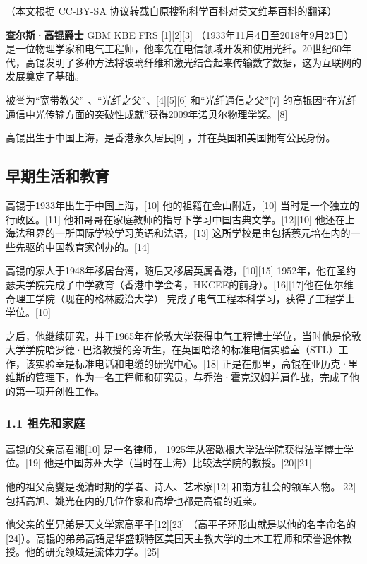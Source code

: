 
（本文根据 CC-BY-SA 协议转载自原搜狗科学百科对英文维基百科的翻译）

\textbf{查尔斯·高锟爵士} GBM KBE FRS [1][2][3] （1933年11月4日至2018年9月23日）是一位物理学家和电气工程师，他率先在电信领域开发和使用光纤。20世纪60年代，高锟发明了多种方法将玻璃纤维和激光结合起来传输数字数据，这为互联网的发展奠定了基础。

被誉为“宽带教父” 、“光纤之父”、[4][5][6] 和“光纤通信之父”[7] 的高锟因“在光纤通信中光传输方面的突破性成就”获得2009年诺贝尔物理学奖。[8]

高锟出生于中国上海，是香港永久居民[9] ，并在英国和美国拥有公民身份。

\subsection{早期生活和教育}
高锟于1933年出生于中国上海，[10] 他的祖籍在金山附近，[10] 当时是一个独立的行政区。[11] 他和哥哥在家庭教师的指导下学习中国古典文学。[12][10] 他还在上海法租界的一所国际学校学习英语和法语，[13] 这所学校是由包括蔡元培在内的一些先驱的中国教育家创办的。[14]

高锟的家人于1948年移居台湾，随后又移居英属香港，[10][15] 1952年，他在圣约瑟夫学院完成了中学教育（香港中学会考，HKCEE的前身）。[16][17]他在伍尔维奇理工学院（现在的格林威治大学） 完成了电气工程本科学习，获得了工程学士学位。[10]

之后，他继续研究，并于1965年在伦敦大学获得电气工程博士学位，当时他是伦敦大学学院哈罗德·巴洛教授的旁听生，在英国哈洛的标准电信实验室（STL）工作，该实验室是标准电话和电缆的研究中心。[18] 正是在那里，高锟在亚历克·里维斯的管理下，作为一名工程师和研究员，与乔治·霍克汉姆并肩作战，完成了他的第一项开创性工作。

\subsubsection{1.1 祖先和家庭}
高锟的父亲高君湘[10] 是一名律师， 1925年从密歇根大学法学院获得法学博士学位。[19] 他是中国苏州大学（当时在上海）比较法学院的教授。[20][21]

他的祖父高燮是晚清时期的学者、诗人、艺术家[12] 和南方社会的领军人物。[22] 包括高旭、姚光在内的几位作家和高增也都是高锟的近亲。

他父亲的堂兄弟是天文学家高平子[12][23] （高平子环形山就是以他的名字命名的[24]）。高锟的弟弟高铻是华盛顿特区美国天主教大学的土木工程师和荣誉退休教授。他的研究领域是流体力学。[25]

